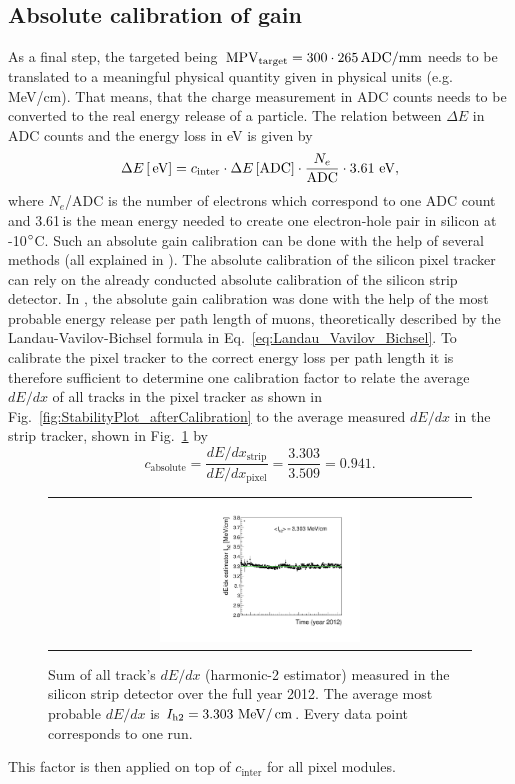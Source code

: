 \subsection*{Absolute calibration of gain}
As a final step, the targeted \mpv being $\,\text{MPV}_{\text{target}}=300 \cdot 265 \,  \text{ADC/mm}$ needs to be translated to a meaningful physical quantity given in physical units (e.g. MeV/cm).
That means, that the charge measurement in ADC counts needs to be converted to the real energy release of a particle.
The relation between $\Delta E$ in ADC counts and the energy loss in eV is given by
\begin{equation*}
\Delta E\,[\,\text{e}\kern-0.06667em\text{V}] = c_{\text{inter}} \cdot \Delta E\,[\text{ADC}] \cdot \frac{N_e}{\text{ADC}} \cdot 3.61 \, \,\text{e}\kern-0.06667em\text{V},
\end{equation*}
where $N_e$/ADC is the number of electrons which correspond to one ADC count and 3.61\,\ev is the  mean energy needed to create one electron-hole pair in silicon at -10$\degree$C.
Such an absolute gain calibration can be done with the help of several methods (all explained in \cite{bib:Quertenmont_2010}).
The absolute calibration of the silicon pixel tracker can rely on the already conducted absolute calibration of the silicon strip detector.
In \cite{bib:Quertenmont_2010}, the absolute gain calibration was done with the help of the most probable energy release per path length of muons, 
theoretically described by the Landau-Vavilov-Bichsel formula in Eq.~\ref{eq:Landau_Vavilov_Bichsel}.  
To calibrate the pixel tracker to the correct energy loss per path length it is therefore sufficient to determine one calibration factor to relate the average $dE/dx$ of all tracks in the pixel tracker as shown in 
Fig.~\ref{fig:StabilityPlot_afterCalibration} to the average measured $dE/dx$ in the strip tracker, shown in Fig.~\ref{fig:StabilityPlot_Strip} by
\begin{equation*}
c_{\text{absolute}} = \frac{dE/dx_{\text{strip}}}{dE/dx_{\text{pixel}}} = \frac{3.303}{3.509} = 0.941.
\end{equation*}
\begin{figure}[!bt]
  \centering 
  \begin{tabular}{c}
  \includegraphics[width=0.49\textwidth]{figures/analysis/StabilityPlot_Strip_afterCalibration_withoutStepFits_NEW.pdf}
  \end{tabular}
  \caption{Sum of all track's $dE/dx$ (harmonic-2 estimator) measured in the silicon strip detector over the full year 2012. The average most probable $dE/dx$ is $I_{\text{h2}}=3.303\,\,\text{Me}\kern-0.06667em\text{V}/\,\text{cm}$. Every data point corresponds to one run.} 
  \label{fig:StabilityPlot_Strip}
\end{figure}
This factor is then applied on top of $c_{\text{inter}}$ for all pixel modules.


